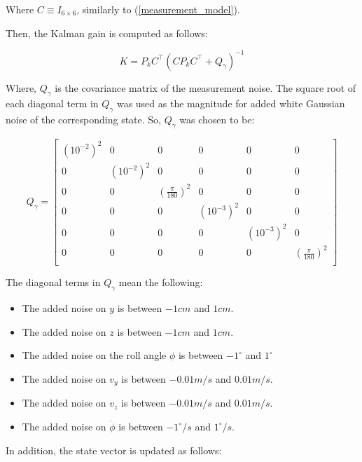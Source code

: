 \documentclass{thesisreport}
\begin{document}
    Where $C \equiv	I_{6 \times 6}$, similarly to (\ref{measurement_model}).

Then, the Kalman gain is computed as follows:

\begin{equation}
        K = P_k C^{\intercal} (C P_k C^{\intercal} + Q_{\gamma})^{-1}
    \end{equation}

Where, $Q_{\gamma}$ is the covariance matrix of the measurement noise. The square root of each diagonal term in $Q_{\gamma}$ was used as the magnitude for added white Gaussian noise of the corresponding state. So, $Q_{\gamma}$ was chosen to be:

 \begin{equation}
        Q_{\gamma} = \begin{bmatrix}
                (10^{-2})^2 & 0 & 0 & 0  & 0 & 0 \\
                0 & (10^{-2})^2 & 0 & 0  & 0 & 0 \\
                0 & 0 & (\frac{\pi}{180})^2 & 0 & 0 & 0 \\
                0 & 0 & 0 & (10^{-3})^2 & 0 & 0 \\
                0 & 0 & 0 & 0 & (10^{-3})^2 & 0 \\
                0 & 0 & 0 & 0 & 0 & (\frac{\pi}{180})^2 \\
            \end{bmatrix}
\end{equation}

The diagonal terms in $Q_{\gamma}$ mean the following:

\begin{itemize}
	\item The added noise on $y$ is between $-1cm$ and $1cm$.
	\item The added noise on $z$ is between $-1cm$ and $1cm$.
	\item The added noise on the roll angle $\phi$ is between $-1^{\circ}$ and $1^{\circ}$
	\item The added noise on $v_y$ is between $-0.01m/s$ and $0.01m/s$.
	\item The added noise on $v_z$ is between $-0.01m/s$ and $0.01m/s$.
	\item The added noise on $\dot{\phi}$ is between $-1^{\circ}/s$ and $1^{\circ}/s$.
\end{itemize}
        
    In addition, the state vector is updated as follows:
    
\end{document}
